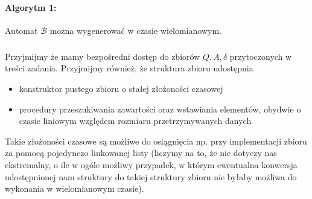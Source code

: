 \documentclass[12pt]{article}
\begin{document}
\clearpage

\paragraph{Algorytm 1:}
Automat $\mathcal{B}$ można wygenerować w czasie wielomianowym. 
\subparagraph{}
Przyjmijmy że mamy bezpośredni dostęp do zbiorów $Q, A, \delta$ przytoczonych w treści zadania.
Przyjmijmy również, że struktura zbioru udostępnia
\begin{itemize}
	\item konstruktor pustego zbioru o stałej złożoności czasowej
	\item procedury przeszukiwania zawartości oraz wstawiania elementów, obydwie o czasie
              liniowym względem rozmiaru przetrzymywanych danych
\end{itemize}

Takie złożoności czasowe są możliwe do osiągnięcia np. przy implementacji zbioru za pomocą
pojedynczo linkowanej listy (liczymy na to, że nie dotyczy nas ekstremalny, o ile w ogóle możliwy
przypadek, w którym ewentualna konwersja udostępnionej nam struktury do takiej struktury zbioru
nie byłaby możliwa do wykonania w wielomianowym czasie).
\end{document}
